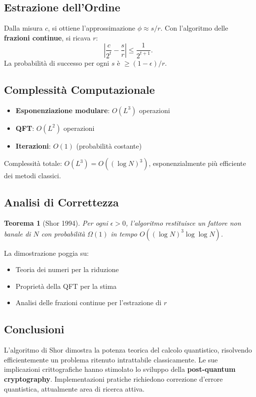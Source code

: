 \documentclass[a4paper,12pt]{report}
\theoremstyle{plain}
\newtheorem{theorem}{Teorema}[chapter]
\begin{document}
\subsection{Estrazione dell'Ordine}
Dalla misura \(c\), si ottiene l'approssimazione \(\phi \approx s/r\). Con l'algoritmo delle \textbf{frazioni continue}, si ricava \(r\):
\[
\left| \frac{c}{2^t} - \frac{s}{r} \right| \leq \frac{1}{2^{t+1}}.
\]
La probabilità di successo per ogni \(s\) è \(\geq (1-\epsilon)/r\).

\subsection{Complessità Computazionale}
\begin{itemize}
    \item \textbf{Esponenziazione modulare}: \(O(L^3)\) operazioni
    \item \textbf{QFT}: \(O(L^2)\) operazioni
    \item \textbf{Iterazioni}: \(O(1)\) (probabilità costante)
\end{itemize}
Complessità totale: \(O(L^3) = O((\log N)^3)\), esponenzialmente più efficiente dei metodi classici.

\subsection{Analisi di Correttezza}
\begin{theorem}[Shor 1994]
Per ogni \(\epsilon > 0\), l'algoritmo restituisce un fattore non banale di \(N\) con probabilità \(\Omega(1)\) in tempo \(O((\log N)^3 \log \log N)\).
\end{theorem}
La dimostrazione poggia su:
\begin{itemize}
    \item Teoria dei numeri per la riduzione
    \item Proprietà della QFT per la stima
    \item Analisi delle frazioni continue per l'estrazione di \(r\)
\end{itemize}

\subsection{Conclusioni}
L'algoritmo di Shor dimostra la potenza teorica del calcolo quantistico, risolvendo efficientemente un problema ritenuto intrattabile classicamente. Le sue implicazioni crittografiche hanno stimolato lo sviluppo della \textbf{post-quantum cryptography}. Implementazioni pratiche richiedono correzione d'errore quantistica, attualmente area di ricerca attiva.
\end{document}
